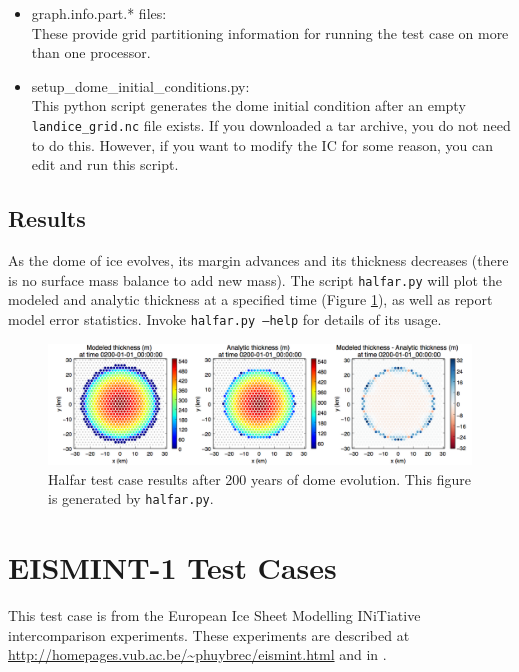 \begin{itemize}
	\item graph.info.part.* files: \\ 
		These provide grid partitioning information for running the test case on more than one processor.  
		
	\item setup\_dome\_initial\_conditions.py: \\
		This python script generates the dome initial condition after an empty \texttt{landice\_grid.nc} file exists.  
		If you downloaded a tar archive, you do not need to do this.  However, if you want to modify the IC for 
		some reason, you can edit and run this script.

\end{itemize}

\subsection{Results}
\label{subsecc:halfar_results}
As the dome of ice evolves, its margin advances and its thickness decreases (there is no surface mass balance to add new mass).  The script \texttt{halfar.py} will plot the modeled and analytic thickness at a specified time (Figure \ref{fig:halfarresults}), as well as report model error statistics.  Invoke \texttt{halfar.py --help} for details of its usage.


\begin{figure}[H]
	\centering
	\includegraphics[width=16.4cm]{landice/figures/halfar.png}
	\caption{Halfar test case results after 200 years of dome evolution. This figure is generated by \texttt{halfar.py}.}
	\label{fig:halfarresults}
\end{figure}


\FloatBarrier


\section{EISMINT-1 Test Cases}
\label{sec:eismint_description}
This test case is from the European Ice Sheet Modelling INiTiative intercomparison experiments.  These experiments are described at \url{http://homepages.vub.ac.be/~phuybrec/eismint.html} and in \citet{Huybrechts1996}.

